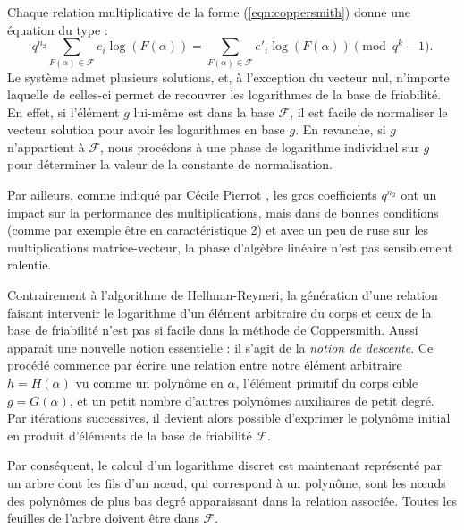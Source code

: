 \documentclass[a4paper, titlepage, 11pt]{article}
\theoremstyle{definition}
\theoremstyle{remark}
\begin{document}
Chaque relation multiplicative de la forme (\ref{eqn:coppersmith}) donne une équation du type :
$$q^{n_2} \sum_{F(\alpha) \in \mathcal{F}} e_i \log(F(\alpha)) = \sum_{F(\alpha) \in \mathcal{F}} e'_i \log(F(\alpha)) \pmod{q^k-1}.$$
Le système admet plusieurs solutions, et, à l'exception du vecteur nul, n'importe laquelle de celles-ci permet de recouvrer les logarithmes de la base de friabilité. En effet, si l'élément $g$ lui-même est dans la base $\mathcal{F}$, il est facile de normaliser le vecteur solution pour avoir les logarithmes en base $g$. En revanche, si $g$ n'appartient à $\mathcal{F}$, nous procédons à une phase de logarithme individuel sur $g$ pour déterminer la valeur de la constante de normalisation.

Par ailleurs, comme indiqué par Cécile Pierrot \cite{pierrot2016}, les gros coefficients $q^{n_2}$ ont un impact sur la performance des multiplications, mais dans de bonnes conditions (comme par exemple être en caractéristique 2) et avec un peu de ruse sur les multiplications matrice-vecteur, la phase d'algèbre linéaire n'est pas sensiblement ralentie.

Contrairement à l'algorithme de Hellman-Reyneri, la génération d'une relation faisant intervenir le logarithme d'un élément arbitraire du corps et ceux de la base de friabilité n'est pas si facile dans la méthode de Coppersmith. Aussi apparaît une nouvelle notion essentielle : il s'agit de la \textit{notion de descente}. Ce procédé commence par écrire une relation entre notre élément arbitraire $h = H(\alpha)$ vu comme un polynôme en $\alpha$, l'élément primitif du corps cible $g = G(\alpha)$, et un petit nombre d'autres polynômes auxiliaires de petit degré. Par itérations successives, il devient alors possible d'exprimer le polynôme initial en produit d'éléments de la base de friabilité $\mathcal{F}$.

Par conséquent, le calcul d'un logarithme discret est maintenant représenté par un arbre dont les fils d'un n\oe ud, qui correspond à un polynôme, sont les n\oe uds des polynômes de plus bas degré apparaissant dans la relation associée. Toutes les feuilles de l'arbre doivent être dans $\mathcal{F}$.
\end{document}

